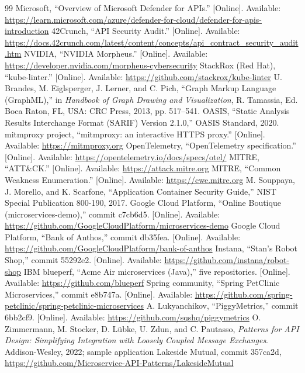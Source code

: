 \documentclass[conference]{IEEEtran}
\begin{document}
\begin{thebibliography}{99}
 Microsoft, ``Overview of Microsoft Defender for APIs.'' [Online]. Available: \url{https://learn.microsoft.com/azure/defender-for-cloud/defender-for-apis-introduction}
 42Crunch, ``API Security Audit.'' [Online]. Available: \url{https://docs.42crunch.com/latest/content/concepts/api_contract_security_audit.htm}
 NVIDIA, ``NVIDIA Morpheus.'' [Online]. Available: \url{https://developer.nvidia.com/morpheus-cybersecurity}
 StackRox (Red Hat), ``kube-linter.'' [Online]. Available: \url{https://github.com/stackrox/kube-linter}
 U. Brandes, M. Eiglsperger, J. Lerner, and C. Pich, ``Graph Markup Language (GraphML),'' in \textit{Handbook of Graph Drawing and Visualization}, R. Tamassia, Ed. Boca Raton, FL, USA: CRC Press, 2013, pp. 517--541.
 OASIS, ``Static Analysis Results Interchange Format (SARIF) Version 2.1.0,'' OASIS Standard, 2020.
 mitmproxy project, ``mitmproxy: an interactive HTTPS proxy.'' [Online]. Available: \url{https://mitmproxy.org}
 OpenTelemetry, ``OpenTelemetry specification.'' [Online]. Available: \url{https://opentelemetry.io/docs/specs/otel/}
 MITRE, ``ATT\&CK.'' [Online]. Available: \url{https://attack.mitre.org}
 MITRE, ``Common Weakness Enumeration.'' [Online]. Available: \url{https://cwe.mitre.org}
 M. Souppaya, J. Morello, and K. Scarfone, ``Application Container Security Guide,'' NIST Special Publication 800-190, 2017.
 Google Cloud Platform, ``Online Boutique (microservices-demo),'' commit c7cb6d5. [Online]. Available: \url{https://github.com/GoogleCloudPlatform/microservices-demo}
 Google Cloud Platform, ``Bank of Anthos,'' commit db35fea. [Online]. Available: \url{https://github.com/GoogleCloudPlatform/bank-of-anthos}
 Instana, ``Stan's Robot Shop,'' commit 55292e2. [Online]. Available: \url{https://github.com/instana/robot-shop}
 IBM blueperf, ``Acme Air microservices (Java),'' five repositories. [Online]. Available: \url{https://github.com/blueperf}
 Spring community, ``Spring PetClinic Microservices,'' commit e8b747a. [Online]. Available: \url{https://github.com/spring-petclinic/spring-petclinic-microservices}
 A. Lukyanchikov, ``PiggyMetrics,'' commit 6bb2cf9. [Online]. Available: \url{https://github.com/sqshq/piggymetrics}
 O. Zimmermann, M. Stocker, D. L\"ubke, U. Zdun, and C. Pautasso, \textit{Patterns for API Design: Simplifying Integration with Loosely Coupled Message Exchanges}. Addison-Wesley, 2022; sample application Lakeside Mutual, commit 357ca2d, \url{https://github.com/Microservice-API-Patterns/LakesideMutual}

\end{thebibliography}
\end{document}
